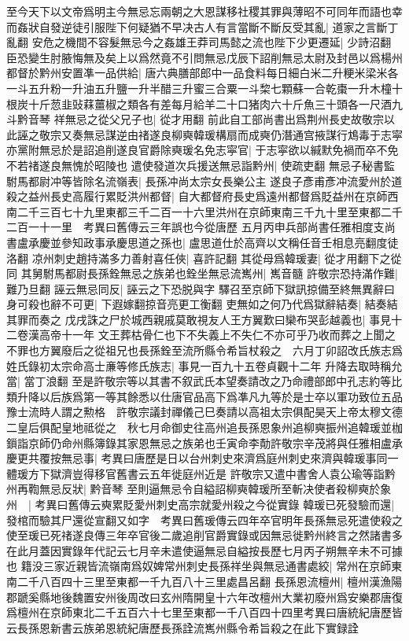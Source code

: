 至今天下以文帝爲明主今無忌忘兩朝之大恩謀移社稷其罪與薄昭不可同年而語也幸而姦狀自發逆徒引服陛下何疑猶不早决古人有言當斷不斷反受其亂|{
	道家之言斷丁亂翻}
安危之機間不容髮無忌今之姦雄王莽司馬懿之流也陛下少更遷延|{
	少詩沼翻}
臣恐變生肘腋悔無及矣上以爲然竟不引問無忌戊辰下詔削無忌太尉及封邑以爲楊州都督於黔州安置凖一品供給|{
	唐六典膳部郎中一品食料每日細白米二升粳米梁米各一斗五升粉一升油五升鹽一升半醋三升蜜三合粟一斗棃七顆蘇一合乾棗一升木橦十根炭十斤䓤韭䜴䔉薑椒之類各有差每月給羊二十口猪肉六十斤魚三十頭各一尺酒九斗黔音琴}
祥無忌之從父兄子也|{
	從才用翻}
前此自工部尚書出爲荆州長史故敬宗以此誣之敬宗又奏無忌謀逆由禇遂良柳奭韓瑗構扇而成奭仍潛通宫掖謀行鴆毒于志寜亦黨附無忌於是詔追削遂良官爵除奭瑗名免志寜官|{
	于志寜欲以緘默免禍而卒不免不若禇遂良無愧於昭陵也}
遣使發道次兵援送無忌詣黔州|{
	使疏吏翻}
無忌子秘書監駙馬都尉冲等皆除名流嶺表|{
	長孫冲尚太宗女長樂公主}
遂良子彥甫彥冲流愛州於道殺之益州長史高履行累貶洪州都督|{
	自大都督府長史爲遠州都督爲貶益州在京師西南二千三百七十九里東都三千二百一十六里洪州在京師東南三千九十里至東都二千二百一十一里　考異曰舊傳云三年誤也今從唐歷}
五月丙申兵部尚書任雅相度支尚書盧承慶並參知政事承慶思道之孫也|{
	盧思道仕於高齊以文稱任音壬相息亮翻度徒洛翻}
凉州刺史趙持滿多力善射喜任俠|{
	喜許記翻}
其從母爲韓瑗妻|{
	從才用翻下之從同}
其舅駙馬都尉長孫銓無忌之族弟也銓坐無忌流嶲州|{
	嶲音髓}
許敬宗恐持滿作難|{
	難乃旦翻}
誣云無忌同反|{
	誣云之下恐脱與字}
驛召至京師下獄訊掠備至終無異辭曰身可殺也辭不可更|{
	下遐嫁翻掠音亮更工衡翻}
吏無如之何乃代爲獄辭結奏|{
	結奏結其罪而奏之}
戊戌誅之尸於城西親戚莫敢視友人王方翼歎曰欒布哭彭越義也|{
	事見十二卷漢高帝十一年}
文王葬枯骨仁也下不失義上不失仁不亦可乎乃收而葬之上聞之不罪也方翼廢后之從祖兄也長孫銓至流所縣令希旨杖殺之　六月丁卯詔改氏族志爲姓氏錄初太宗命高士亷等修氏族志|{
	事見一百九十五卷貞觀十二年}
升降去取時稱允當|{
	當丁浪翻}
至是許敬宗等以其書不叙武氏本望奏請改之乃命禮部郎中孔志約等比類升降以后族爲第一等其餘悉以仕唐官品高下爲凖凡九等於是士卒以軍功致位五品豫士流時人謂之勲格　許敬宗議封禪儀己巳奏請以高祖太宗俱配昊天上帝太穆文德二皇后俱配皇地祗從之　秋七月命御史往高州追長孫恩象州追柳奭振州追韓瑗並枷鎻詣京師仍命州縣簿錄其家恩無忌之族弟也壬寅命李勣許敬宗辛茂將與任雅相盧承慶更共覆按無忌事|{
	考異曰唐歷是日以台州刺史來濟爲庭州刺史來濟與韓瑗事同一體瑗方下獄濟豈得移官舊書云五年徙庭州近是}
許敬宗又遣中書舍人袁公瑜等詣黔州再鞫無忌反狀|{
	黔音琴}
至則逼無忌令自縊詔柳奭韓瑗所至斬决使者殺柳奭於象州　|{
	考異曰舊傳云奭累貶愛州刺史高宗就愛州殺之今從實錄}
韓瑗已死發驗而還|{
	發棺而驗其尸還從宣翻又如字　考異曰舊瑗傳云四年卒官明年長孫無忌死遣使殺之使至瑗已死禇遂良傳三年卒官後二歲追削官爵實錄或因無忌徙黔州終言之然諸書多在此月蓋因實錄年代記云七月辛未遣使逼無忌自縊按長歷七月丙子朔無辛未不可據也}
籍没三家近親皆流嶺南爲奴婢常州刺史長孫祥坐與無忌通書處絞|{
	常州在京師東南二千八百四十三里至東都一千九百八十三里處昌呂翻}
長孫恩流檀州|{
	檀州漢漁陽郡蹏奚縣地後魏置安州後周改曰玄州隋開皇十六年改檀州大業初廢州爲安樂郡唐復爲檀州在京師東北二千五百六十七里至東都一千八百四十四里考異曰唐統紀唐歷皆云長孫恩新書云族弟恩統紀唐歷長孫詮流嶲州縣令希旨殺之在此下實録詮}


